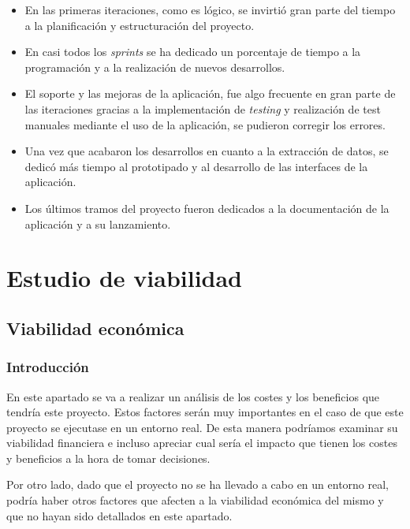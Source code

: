 \begin{itemize}
\item En las primeras iteraciones, como es lógico, se invirtió gran parte del tiempo a la planificación y estructuración del proyecto.

\item En casi todos los \textit{sprints} se ha dedicado un porcentaje de tiempo a la programación y a la realización de nuevos desarrollos.

\item El soporte y las mejoras de la aplicación, fue algo frecuente en gran parte de las iteraciones gracias a la implementación de \textit{testing} y realización de test manuales mediante el uso de la aplicación, se pudieron corregir los errores.

\item Una vez que acabaron los desarrollos en cuanto a la extracción de datos, se dedicó más tiempo al prototipado y al desarrollo de las interfaces de la aplicación.

\item Los últimos tramos del proyecto fueron dedicados a la documentación de la aplicación y a su lanzamiento.

\end{itemize}

\section{Estudio de viabilidad}

\subsection{Viabilidad económica}

\subsubsection{Introducción}
En este apartado se va a realizar un análisis de los costes y los beneficios que tendría este proyecto. Estos factores serán muy importantes en el caso de que este proyecto se ejecutase en un entorno real. De esta manera podríamos examinar su viabilidad financiera e incluso apreciar cual sería el impacto que tienen los costes y beneficios a la hora de tomar decisiones.

Por otro lado, dado que el proyecto no se ha llevado a cabo  en un entorno real, podría haber otros factores que afecten a la viabilidad económica del mismo y que no hayan sido detallados en este apartado.


